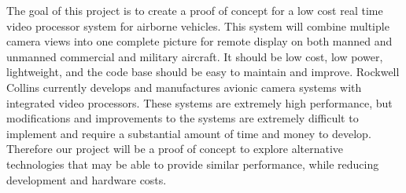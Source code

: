 The goal of this project is to create a proof of concept for a low cost real time video processor system for airborne vehicles. This system will combine multiple camera views into one complete picture for remote display on both manned and unmanned commercial and military aircraft. It should be low cost, low power, lightweight, and the code base should be easy to maintain and improve. Rockwell Collins currently develops and manufactures avionic camera systems with integrated video processors. These systems are extremely high performance, but modifications and improvements to the systems are extremely difficult to implement and require a substantial amount of time and money to develop. Therefore our project will be a proof of concept to explore alternative technologies that may be able to provide similar performance, while reducing development and hardware costs.